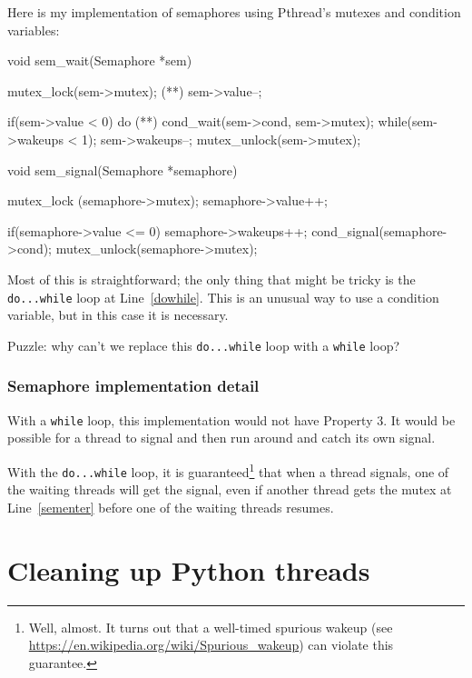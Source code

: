\documentclass{book}
\begin{document}
Here is my implementation of semaphores using Pthread's mutexes
and condition variables:


\begin{unbreakable}[title={}]{}
void sem_wait(Semaphore *sem) {
 mutex_lock(sem->mutex);                 (*\label{sementer}*)
 sem->value--;

 if(sem->value < 0) {
  do {                                                (*\label{dowhile}*)
   cond_wait(sem->cond, sem->mutex);
  } while(sem->wakeups < 1);
   sem->wakeups--;
  }
 mutex_unlock(sem->mutex);
}

void sem_signal(Semaphore *semaphore) {
 mutex_lock (semaphore->mutex);
 semaphore->value++;

 if(semaphore->value <= 0) {
  semaphore->wakeups++;
  cond_signal(semaphore->cond);
 }
 mutex_unlock(semaphore->mutex);
}
\end{unbreakable}

Most of this is straightforward; the only thing that might be
tricky is the {\tt do...while} loop at Line~\ref{dowhile}.
This is an unusual way to use a condition variable, but in
this case it is necessary.

Puzzle: why can't we replace this {\tt do...while} loop
with a {\tt while} loop?


\subsection{Semaphore implementation detail}

With a {\tt while} loop, this implementation would not have
Property 3.  It would be possible for a thread to signal
and then run around and catch its own signal.

With the {\tt do...while} loop, it is guaranteed\footnote{Well,
    almost.  It turns out that a well-timed spurious wakeup (see
    \url{https://en.wikipedia.org/wiki/Spurious_wakeup}) can violate this
    guarantee.} that when a thread signals, one of the waiting threads
will get the signal, even if another thread gets the mutex at
Line~\ref{sementer} before one of the waiting threads resumes.





\appendix

\chapter{Cleaning up Python threads}
\label{cleanup}
\end{document}

